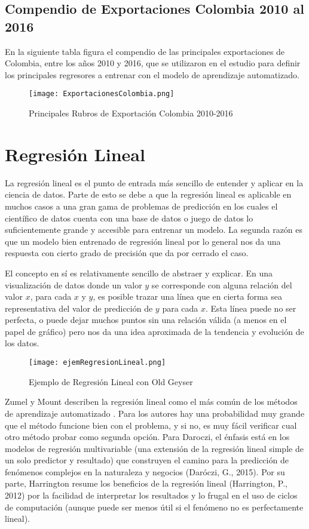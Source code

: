 \begin{spacing}{1.5}
\subsection{Compendio de Exportaciones Colombia 2010 al 2016}
En la siguiente tabla figura el compendio de las principales exportaciones de Colombia, entre los años 2010 y 2016, que se utilizaron en el estudio para definir los principales regresores a entrenar con el modelo de aprendizaje automatizado. \\

\begin{figure}[h!]
\centering
\texttt{[image: ExportacionesColombia.png]}
\caption{Principales Rubros de Exportación Colombia 2010-2016}
\end{figure}

\section{Regresión Lineal}
La regresión lineal es el punto de entrada más sencillo de entender y aplicar en la ciencia de datos. Parte de esto se debe a que la regresión lineal es aplicable en muchos casos a una gran gama de problemas de predicción en los cuales el científico de datos cuenta con una base de datos o juego de datos lo suficientemente grande y accesible para entrenar un modelo. La segunda razón es que un modelo bien entrenado de regresión lineal por lo general nos da una respuesta con cierto grado de precisión que da por cerrado el caso. 

El concepto en sí es relativamente sencillo de abstraer y explicar. En una visualización de datos donde un valor $y$ se corresponde con alguna relación del valor $x$, para cada $x$ y $y$, es posible trazar una línea que en cierta forma sea representativa del valor de predicción de $y$ para cada $x$. Esta línea puede no ser perfecta, o puede dejar muchos puntos sin una relación válida (a menos en el papel de gráfico) pero nos da una idea aproximada de la tendencia y evolución de los datos. \\

\begin{figure}[h!]
    \centering
    \texttt{[image: ejemRegresionLineal.png]}
    \caption{Ejemplo de Regresión Lineal con Old Geyser}
\end{figure}

Zumel y Mount describen la regresión lineal como el más común de los métodos de aprendizaje automatizado \cite{zumelMount}. Para los autores hay una probabilidad muy grande que el método funcione bien con el problema, y si no, es muy fácil verificar cual otro método probar como segunda opción. Para Daroczi, el énfasis está en los modelos de regresión multivariable (una extensión de la regresión lineal simple de un solo predictor y resultado) que construyen el camino para la predicción de fenómenos complejos en la naturaleza y negocios (Daróczi, G., 2015). Por su parte, Harrington resume los beneficios de la regresión lineal (Harrington, P., 2012) por la facilidad de interpretar los resultados y lo frugal en el uso de ciclos de computación (aunque puede ser menos útil si el fenómeno no es perfectamente lineal).


\end{spacing}
